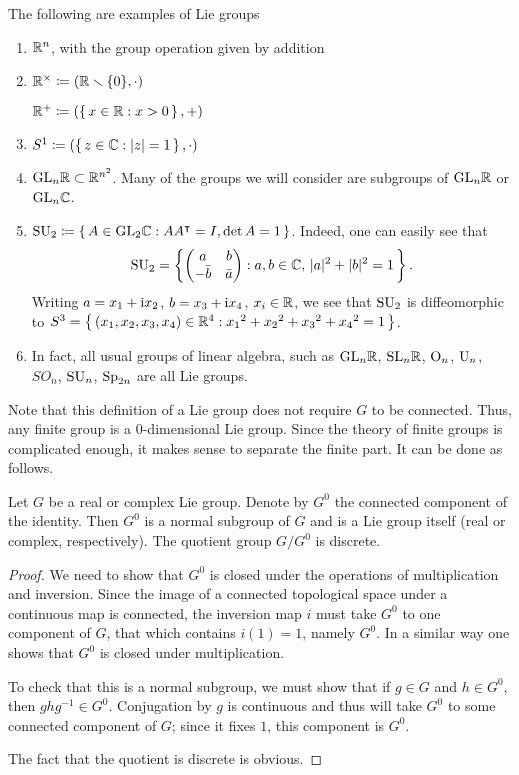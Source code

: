 \begin{example}
  The following are examples of Lie groups
  \begin{enumerate}[label=(\arabic*)]
  \item $\mathbb{R}^n$, with the group operation given by addition
  \item $\mathbb{R}^\times\coloneq(\mathbb{R}\smallsetminus\{0\},\cdot)$

    $\mathbb{R}^+\coloneq(\left\{\,x\in\mathbb{R}:x>0\,\right\},+)$
  \item $S^1\coloneq(\left\{\,z\in\mathbb{C}:|z|=1\,\right\},\cdot)$
  \item $\mathrm{GL}_n\mathbb{R}\subset\mathbb{R}^{n^2}$. Many of the groups we will consider
    are subgroups of $\mathrm{GL}_n\mathbb{R}$ or $\mathrm{GL}_n\mathbb{C}$.
  \item $\mathrm{SU}_2\coloneq\left\{\,A\in\mathrm{GL}_2\mathbb{C}:AA^\intercal=I,\det
      A=1\,\right\}$. Indeed, one can easily see that
    \[
      \mathrm{SU}_2=\left\{
        \begin{pmatrix}
          a&b\\
          -\bar b&\bar a
        \end{pmatrix}:
        a,b\in\mathbb{C},\,|a|^2+|b|^2=1\,
      \right\}.
    \]
    Writing $a=x_1+\mathrm{i} x_2$, $b=x_3+\mathrm{i} x_4$, $x_i\in\mathbb{R}$, we see that
    $\mathrm{SU}_2$ is diffeomorphic to
    $S^3=\left\{\,(x_1,x_2,x_3,x_4)\in\mathbb{R}^4:{x_1}^2+{x_2}^2+{x_3}^2+{x_4}^2=1\,\right\}$.
  \item In fact, all usual groups of linear algebra, such as $\mathrm{GL}_n\mathbb{R}$,
    $\mathrm{SL}_n\mathbb{R}$, $\mathrm{O}_n$, $\mathrm{U}_n$, $SO_n$, $\mathrm{SU}_n$, $\mathrm{Sp}_{2n}$ are all
    Lie groups.
  \end{enumerate}
\end{example}

Note that this definition of a Lie group does not require $G$ to be
connected. Thus, any finite group is a $0$-dimensional Lie group. Since the
theory of finite groups is complicated enough, it makes sense to separate
the finite part. It can be done as follows.

\begin{theorem}
  Let $G$ be a real or complex Lie group. Denote by $G^0$ the connected
  component of the identity. Then $G^0$ is a normal subgroup of $G$ and is
  a Lie group itself (real or complex, respectively). The quotient group
  $G/G^0$ is discrete.
\end{theorem}
\begin{proof}
We need to show that $G^0$ is closed under the operations of multiplication
and inversion. Since the image of a connected topological space under a
continuous map is connected, the inversion map $i$ must take $G^0$ to one
component of $G$, that which contains $i(1)=1$, namely $G^0$. In a similar
way one shows that $G^0$ is closed under multiplication.

To check that this is a normal subgroup, we must show that if $g\in G$ and
$h\in G^0$, then $ghg^{-1}\in G^0$. Conjugation by $g$ is continuous and
thus will take $G^0$ to some connected component of $G$; since it fixes
$1$, this component is $G^0$.

The fact that the quotient is discrete is obvious.
\end{proof}

